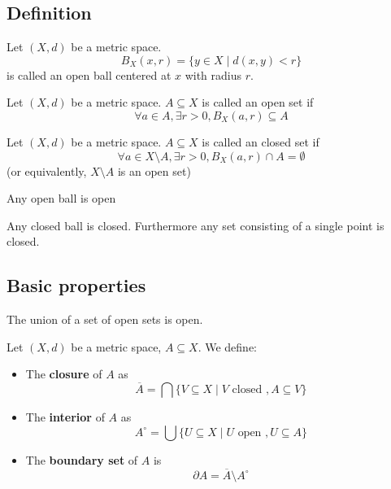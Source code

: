 \subsection{Definition}
\begin{definition}
  Let $(X, d)$ be a metric space.
  \[B_X(x, r) = \{y \in X \mid d(x,y) < r\}\]
  is called an open ball centered at $x$ with radius $r$.
\end{definition}
\begin{definition}
  Let $(X, d)$ be a metric space.
  $A \subseteq X$ is called an open set if 
  \[\forall a \in A, \exists r > 0, B_X(a, r) \subseteq A\]
\end{definition}
\begin{definition}
  Let $(X, d)$ be a metric space.
  $A \subseteq X$ is called an closed set if 
  \[\forall a \in X\setminus A, \exists r > 0, B_X(a, r) \cap A = \emptyset\]
  (or equivalently, $X\setminus A$ is an open set)
\end{definition}

\begin{theorem}
  Any open ball is open
\end{theorem}

\begin{theorem}
  Any closed ball is closed.
  Furthermore any set consisting of a single point is closed.
\end{theorem}

\subsection{Basic properties}
\begin{theorem}
  The union of a set of open sets is open.
\end{theorem}

\begin{definition}
  Let $(X, d)$ be a metric space, $A \subseteq X$. We define:
  \begin{itemize}
    \item The \textbf{closure} of $A$ as
    \[
      \overline{A}= \bigcap\{V \subseteq X \mid V \text{ closed }, A \subseteq V \}
    \]
    \item The \textbf{interior} of $A$ as
    \[
      A^\circ = \bigcup\{U \subseteq X \mid U\text{ open }, U \subseteq A\}
    \]
    \item The \textbf{boundary set} of $A$ is
    \[
      \partial A = \overline{A} \setminus A^\circ
    \]
\end{itemize}
\end{definition}

